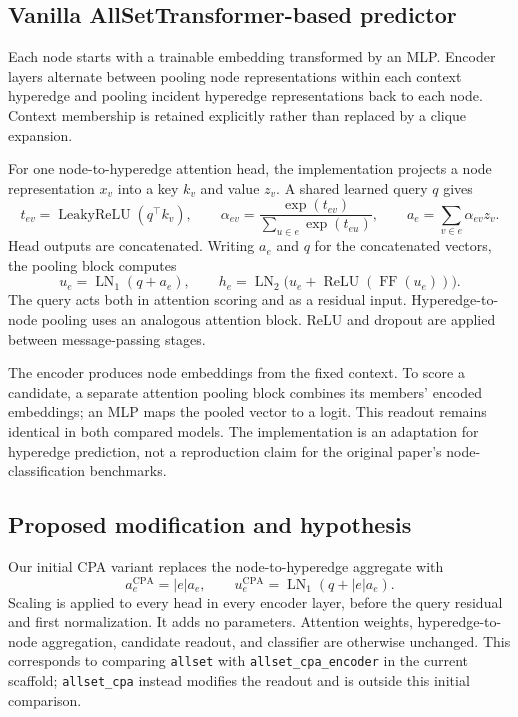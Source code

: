 \documentclass{article}
\begin{document}
\subsection{Vanilla AllSetTransformer-based predictor}
Each node starts with a trainable embedding transformed by an MLP. Encoder layers alternate between pooling node representations within each context hyperedge and pooling incident hyperedge representations back to each node. Context membership is retained explicitly rather than replaced by a clique expansion.

For one node-to-hyperedge attention head, the implementation projects a node representation $x_v$ into a key $k_v$ and value $z_v$. A shared learned query $q$ gives
\begin{equation}
 t_{ev}=\operatorname{LeakyReLU}(q^\top k_v),\qquad
 \alpha_{ev}=\frac{\exp(t_{ev})}{\sum_{u\in e}\exp(t_{eu})},\qquad
 a_e=\sum_{v\in e}\alpha_{ev}z_v.
\end{equation}
Head outputs are concatenated. Writing $a_e$ and $q$ for the concatenated vectors, the pooling block computes
\begin{equation}
 u_e=\operatorname{LN}_1(q+a_e),\qquad
 h_e=\operatorname{LN}_2\bigl(u_e+\operatorname{ReLU}(\operatorname{FF}(u_e))\bigr).
 \label{eq:block}
\end{equation}
The query acts both in attention scoring and as a residual input. Hyperedge-to-node pooling uses an analogous attention block. ReLU and dropout are applied between message-passing stages.

The encoder produces node embeddings from the fixed context. To score a candidate, a separate attention pooling block combines its members' encoded embeddings; an MLP maps the pooled vector to a logit. This readout remains identical in both compared models. The implementation is an adaptation for hyperedge prediction, not a reproduction claim for the original paper's node-classification benchmarks.

\subsection{Proposed modification and hypothesis}
Our initial CPA variant replaces the node-to-hyperedge aggregate with
\begin{equation}
 a_e^{\mathrm{CPA}}=|e|a_e,\qquad
 u_e^{\mathrm{CPA}}=\operatorname{LN}_1(q+|e|a_e).
 \label{eq:cpa}
\end{equation}
Scaling is applied to every head in every encoder layer, before the query residual and first normalization. It adds no parameters. Attention weights, hyperedge-to-node aggregation, candidate readout, and classifier are otherwise unchanged. This corresponds to comparing \texttt{allset} with \texttt{allset\_cpa\_encoder} in the current scaffold; \texttt{allset\_cpa} instead modifies the readout and is outside this initial comparison.
\end{document}
